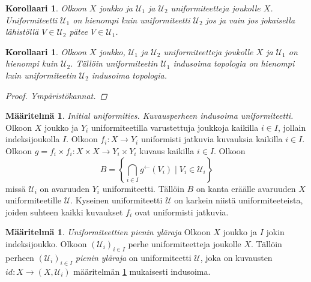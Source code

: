 \documentclass[12pt,a4paper,leqno]{report}
\newcommand{\U}{\mathcal{U}}
\theoremstyle{plain}
\newtheorem{kor}[equation]{Korollaari}
\theoremstyle{definition}
\newtheorem{maar}[equation]{Määritelmä}
\theoremstyle{remark}
\begin{document}
\begin{kor}
Olkoon $X$ joukko ja $\U_1$ ja $\U_2$ uniformiteetteja joukolle $X$. 
Uniformiteetti $\U_1$ on hienompi kuin uniformiteetti $\U_2$ jos ja vain jos jokaisella lähistöllä $V\in\U_2$ pätee $V\in\U_1$.
\end{kor}
\begin{kor}
Olkoon $X$ joukko, $\U_1$ ja $\U_2$ uniformiteetteja joukolle $X$ ja 
$\U_1$ on hienompi kuin $\U_2$. Tällöin uniformiteetin $\U_1$ indusoima topologia on hienompi kuin uniformiteetin $\U_2$ indusoima topologia.
\begin{proof}
Ympäristökannat.
\end{proof}
\end{kor}
\begin{maar}\label{kuvausperheen indusoima}
\emph{Initial uniformities. Kuvausperheen indusoima uniformiteetti.} 
Olkoon $X$ joukko ja $Y_i$ uniformiteetilla varustettuja joukkoja kaikilla $i\in I$, jollain indeksijoukolla $I$. 
Olkoon $f_i\colon X\rightarrow Y_i$ uniformisti jatkuvia kuvauksia kaikilla $i\in I$. 
Olkoon $g=f_i\times f_i\colon X\times X\rightarrow Y_i\times Y_i$ %
kuvaus kaikilla $i\in I$.
Olkoon $$B=\left\{\bigcap_{i\in I}g^{\leftarrow}(V_i)\mid V_i \in\U_i \right\}$$
missä $\U_i$ on avaruuden $Y_i$ uniformiteetti.
Tällöin $B$ on kanta eräälle avaruuden $X$ uniformiteetille $\U$. 
Kyseinen uniformiteetti $\U$ on karkein niistä uniformiteeteista, joiden suhteen kaikki kuvaukset $f_i$ ovat uniformisti jatkuvia.
\end{maar}
\begin{maar}
\emph{Uniformiteettien pienin yläraja}
Olkoon $X$ joukko ja $I$ jokin indeksijoukko.
Olkoon $(\U_i)_{i\in I}$ perhe uniformiteetteja joukolle $X$.
Tällöin perheen $(\U_i)_{i\in I}$ \emph{pienin yläraja} on uniformiteetti $\U$, joka on kuvausten $id\colon X\rightarrow (X,\U_i)$ määritelmän \ref{kuvausperheen indusoima} mukaisesti indusoima.
\end{maar}
\end{document}
